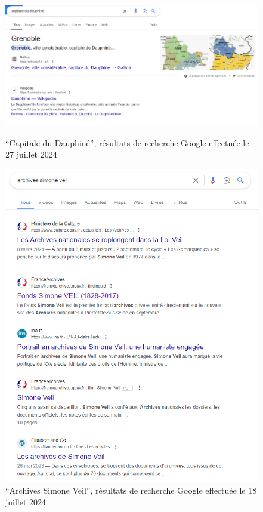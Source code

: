 \begin{figure}[h!]
	\begin{minipage}[b]{0.45\textwidth}
		\centering
		\includegraphics[width=\textwidth]{images/image7.png}
		\caption{\enquote{Capitale du Dauphiné}, résultats de recherche Google effectuée le 27 juillet 2024}
		\label{fig:image7}
	\end{minipage}
	\centering
	\hspace{0.05\textwidth} %
	\begin{minipage}[b]{0.45\textwidth}
		\centering
		\includegraphics[width=\textwidth]{images/image6.png}
		\caption{\enquote{Archives Simone Veil}, résultats de recherche Google effectuée le 18 juillet 2024}
		\label{fig:image6}
	\end{minipage}
\end{figure}


